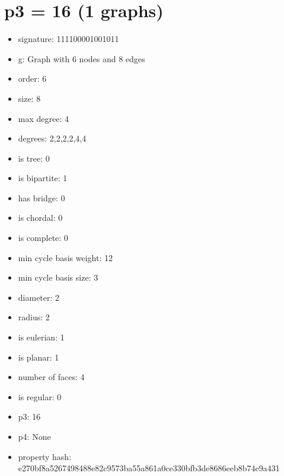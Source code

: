 \chapter{p3 = 16 (1 graphs)}
\newpage\begin{figure}
\end{figure}
\begin{itemize}
\item signature: 111100001001011
\item g: Graph with 6 nodes and 8 edges
\item order: 6
\item size: 8
\item max degree: 4
\item degrees: 2,2,2,2,4,4
\item is tree: 0
\item is bipartite: 1
\item has bridge: 0
\item is chordal: 0
\item is complete: 0
\item min cycle basis weight: 12
\item min cycle basis size: 3
\item diameter: 2
\item radius: 2
\item is eulerian: 1
\item is planar: 1
\item number of faces: 4
\item is regular: 0
\item p3: 16
\item p4: None
\item property hash: e270bf8a5267498488e82c9573ba55a861a0ce330bfb3de8686eeb8b74e9a431
\end{itemize}
\newpage
